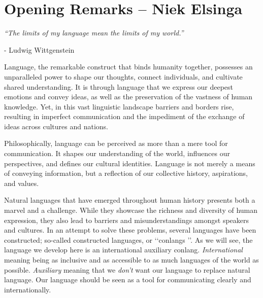 
\setcounter{subsection}{-1}

\section{Opening Remarks -- {\small Niek Elsinga}}

\textit{“The limits of my language mean the limits of my world.”} 

- Ludwig Wittgenstein 

\vspace{0.7cm}
 

\noindent Language, the remarkable construct that binds humanity together, possesses an unparalleled power to shape our thoughts, connect individuals, and cultivate shared understanding. It is through language that we express our deepest emotions and convey ideas, as well as the preservation of the vastness of human knowledge. Yet, in this vast linguistic landscape barriers and borders rise, resulting in imperfect communication and the impediment of the exchange of ideas across cultures and nations. 

Philosophically, language can be perceived as more than a mere tool for communication. It shapes our understanding of the world, influences our perspectives, and defines our cultural identities. Language is not merely a means of conveying information, but a reflection of our collective history, aspirations, and values. 

Natural languages that have emerged throughout human history presents both a marvel and a challenge. While they showcase the richness and diversity of human expression, they also lead to barriers and misunderstandings amongst speakers and cultures. In an attempt to solve these problems, several languages have been constructed; so-called constructed languages, or \lq\lq conlangs \rq\rq. As we will see, the language we develop here is an international auxiliary conlang. {\it International} meaning being as inclusive and as accessible to as much languages of the world as possible. {\it Auxiliary} meaning that we {\it don't} want our language to replace natural language. Our language should be seen as a tool for communicating clearly and internationally. 


